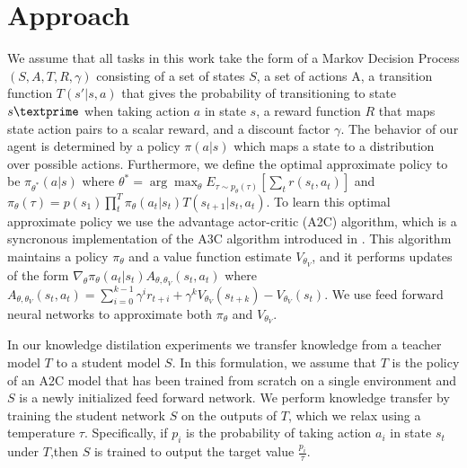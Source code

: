 \section{Approach}
We assume that all tasks in this work take the form of a Markov Decision Process $(S, A, T, R, \gamma)$ consisting of
a set of states $S$, a set of actions A, a transition function $T(s' \vert s, a)$ that gives the
probability of transitioning to state $s \textprime$ when taking action $a$ in state $s$, a reward function
$R$ that maps state action pairs to a scalar reward, and a discount factor $\gamma$. The behavior of our
agent is determined by a policy $\pi(a \vert s)$ which maps a state to a distribution over possible actions.
Furthermore, we define the optimal approximate policy to be $\pi_{\theta^*}(a \vert s)$ where
$\theta^* = \arg\max_{\theta} E_{\tau \sim p_\theta(\tau)}[\sum_t r(s_t, a_t)]$ and
$\pi_\theta(\tau) = p(s_1) \prod_t^T \pi_\theta(a_t \vert s_t)T(s_{t+1} \vert s_t, a_t)$.
To learn this optimal approximate policy we use the advantage actor-critic (A2C) algorithm, which
is a syncronous implementation of the A3C algorithm introduced in \cite{eight}.
This algorithm maintains a policy $\pi_\theta$ and a value function estimate $V_{\theta_V}$,
and it performs updates of the form $\nabla_\theta \pi_\theta(a_t \vert s_t)A_{\theta, \theta_V}(s_t, a_t)$
where $A_{\theta, \theta_V}(s_t, a_t) = \sum_{i=0}^{k-1} \gamma^ir_{t+i} + \gamma^kV_{\theta_V}(s_{t+k}) - V_{\theta_V}(s_t)$.
We use feed forward neural networks to approximate both $\pi_\theta$ and $V_{\theta_V}$.

In our knowledge distilation experiments we transfer knowledge from a teacher model $T$ to a
student model $S$. In this formulation, we assume that $T$ is the policy of an A2C model that
has been trained from scratch on a single environment and $S$ is a newly initialized feed forward network. 
We perform knowledge transfer by training the student network $S$ on the outputs of $T$, 
which we relax using a temperature $\tau$. Specifically, if $p_i$ is the probability of taking action 
$a_i$ in state $s_t$ under $T$,then $S$ is trained to output the target value $\frac{p_i}{\tau}$.

